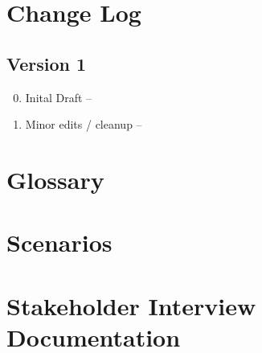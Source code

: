 \documentclass{l3deliverable}
\begin{document}

\appendix
\section{Change Log}
\subsection{Version 1}

\begin{enumerate}
\setcounter{enumi}{-1}
\item{Inital Draft -- \date{2012/11/01}}
\item{Minor edits / cleanup -- \date{2012/11/09}}
\end{enumerate}
\section{Glossary}


\section{Scenarios}


\section{Stakeholder Interview Documentation}




\end{document}
